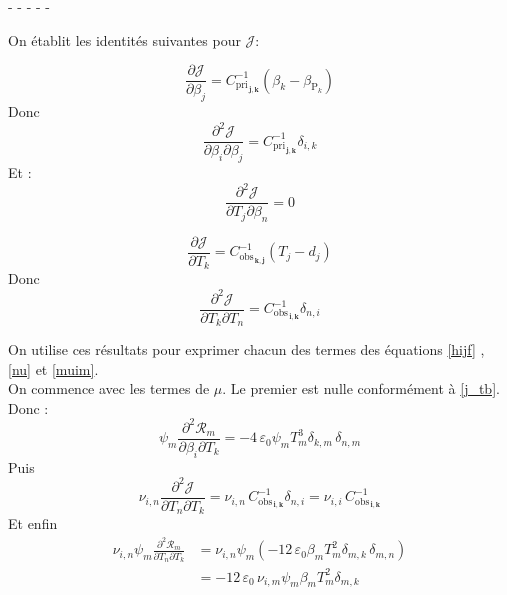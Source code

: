 \documentclass[a4paper,12pt]{article}
\newcommand{\bepar}[1]{
	\left( #1 \right)  
}
\newcommand{\parfracD}[3]{
	\frac{\partial^2 #1}{\partial #2 \partial #3}
}
\newcommand{\parfrac}[2]{
	\frac{\partial #1}{\partial #2}
}
\newcommand{\kro}[2]{
\delta_{#1,#2}
}
\newcommand\bk{\color{black}}
\newcommand\navy{\color{navy}}
\newcommand{\epsz}{\varepsilon_0}
\newcommand{\CP}[2]{C^{-1}_{\text{pri}_{\, \mathbf{#1, #2}}}}
\newcommand{\CO}[2]{C^{-1}_{\text{obs}_{\, \mathbf{#1, #2}}}}
\newcommand{\BP}[1]{\beta_{\text{P}_#1}}
\numberwithin{equation}{section} %
\begin{document}
\begin{center} 
- - - - -
\end{center}

\noindent On établit les identités suivantes pour $\mathcal{J}$:

\begin{equation}
\parfrac{\mathcal{J}}{\beta_j} = \CP{j}{k}\bepar{\beta_k - \BP{k}} \label{j_b}
\end{equation}
Donc
\begin{equation}
\parfracD{\mathcal{J}}{\beta_i}{\beta_j}  = \CP{j}{k} \kro{i}{k} \label{j_bb}
\end{equation}
Et : \navy
\begin{equation}
\parfracD{\mathcal{J}}{T_j}{\beta_n} = 0 \label{j_tb} 
\end{equation}\bk

\begin{equation}
\parfrac{\mathcal{J}}{T_k} = \CO{k}{j}\bepar{T_j - d_j} \label{j_t}
\end{equation}
Donc
\begin{equation}
\parfracD{\mathcal{J}}{T_k}{T_n} = \CO{i}{k}\kro{n}{i} \label{j_tt}
\end{equation}

\pagebreak

\noindent On utilise ces résultats pour exprimer chacun des termes des équations \eqref{hijf} , \eqref{nu} et  \eqref{muim}.\\
On commence avec les termes de $\mu$. Le premier est nulle conformément à \eqref{j_tb}. Donc : \\
\begin{equation}
\psi_m \parfracD{\mathcal{R}_m}{\beta_i}{T_k} = -4\, \epsz \psi_m T_m^3 \kro{k}{m} \, \kro{n}{m}
\end{equation}
Puis 
\begin{equation}
\nu_{i,n} \parfracD{\mathcal{J}}{T_n}{T_k} = \nu_{i,n}\, \CO{i}{k}\kro{n}{i} = \nu_{i,i}\, \CO{i}{k}
\end{equation}
Et enfin
\begin{align}
\nu_{i,n} \psi_m \parfracD{\mathcal{R}_m}{T_n}{T_k} &= \nu_{i,n} \psi_m \bepar{-12\, \epsz \beta_m T_m^2 \kro{m}{k}\, \kro{m}{n}} \\
& = -12\, \epsz\, \nu_{i,m} \psi_m \beta_m T_m^2 \kro{m}{k}
\end{align}
\end{document}
